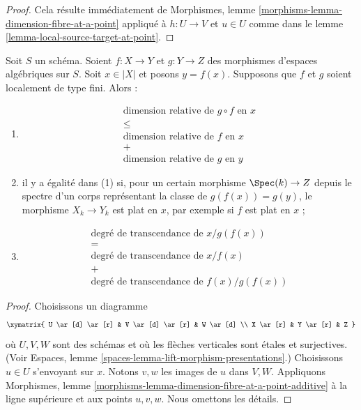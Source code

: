\begin{proof}
Cela résulte immédiatement de
Morphismes, lemme \ref{morphisms-lemma-dimension-fibre-at-a-point}
appliqué à $h : U \to V$ et $u \in U$
comme dans le
lemme \ref{lemma-local-source-target-at-point}.
\end{proof}

\begin{lemma}
\label{lemma-dimension-fibre-at-a-point-additive}
Soit $S$ un schéma.
Soient $f : X \to Y$ et $g : Y \to Z$ des morphismes d'espaces algébriques sur $S$.
Soit $x \in |X|$ et posons $y = f(x)$.
Supposons que $f$ et $g$ soient localement de type fini.
Alors :
\begin{enumerate}
\item
$$
\begin{matrix}
\text{dimension relative de }g \circ f\text{ en }x \\
\leq \\
\text{dimension relative de }f\text{ en }x \\
+ \\
\text{dimension relative de }g\text{ en }y
\end{matrix}
$$
\item il y a égalité dans (1) si, pour un certain morphisme $\Spec(k) \to Z$
depuis le spectre d'un corps représentant la classe de $g(f(x)) = g(y)$,
le morphisme $X_k \to Y_k$ est plat en $x$, par exemple si $f$ est plat en $x$ ;
\item
$$
\begin{matrix}
\text{degré de transcendance de }x/g(f(x)) \\
= \\
\text{degré de transcendance de }x/f(x) \\
+ \\
\text{degré de transcendance de }f(x)/g(f(x))
\end{matrix}
$$
\end{enumerate}
\end{lemma}

\begin{proof}
Choisissons un diagramme
$$
\xymatrix{
U \ar[d] \ar[r] & V \ar[d] \ar[r] & W \ar[d] \\
X \ar[r] & Y \ar[r] & Z
}
$$
où $U, V, W$ sont des schémas et où les flèches verticales sont étales et surjectives. (Voir
Espaces, lemme \ref{spaces-lemma-lift-morphism-presentations}.)
Choisissons $u \in U$ s'envoyant sur $x$. Notons $v, w$ les images
de $u$ dans $V, W$.
Appliquons
Morphismes, lemme \ref{morphisms-lemma-dimension-fibre-at-a-point-additive}
à la ligne supérieure et aux points $u, v, w$. Nous omettons les détails.
\end{proof}

